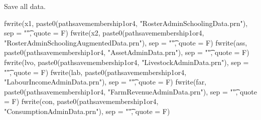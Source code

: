 Save all data.

\begin{Schunk}
\begin{Sinput}
fwrite(x1, paste0(pathsavemembership1or4, "RosterAdminSchoolingData.prn"), sep = "\t", quote = F)
fwrite(x2, paste0(pathsavemembership1or4, "RosterAdminSchoolingAugmentedData.prn"), sep = "\t", quote = F)
fwrite(ass, paste0(pathsavemembership1or4, "AssetAdminData.prn"), sep = "\t", quote = F)
fwrite(lvo, paste0(pathsavemembership1or4, "LivestockAdminData.prn"), sep = "\t", quote = F)
fwrite(lab, paste0(pathsavemembership1or4, "LabourIncomeAdminData.prn"), sep = "\t", quote = F)
fwrite(far, paste0(pathsavemembership1or4, "FarmRevenueAdminData.prn"), sep = "\t", quote = F)
fwrite(con, paste0(pathsavemembership1or4, "ConsumptionAdminData.prn"), sep = "\t", quote = F)
\end{Sinput}
\end{Schunk}


